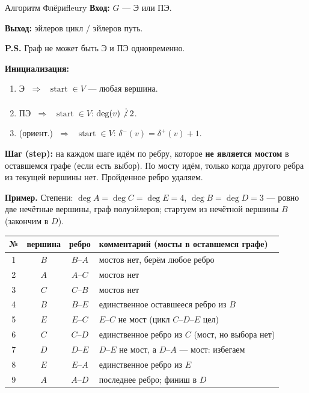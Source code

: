 \begin{algo}{Алгоритм Флёри}{fleury}
\textbf{Вход:} $G$ --- Э или ПЭ.

\textbf{Выход:} эйлеров цикл / эйлеров путь.

\medskip
\textbf{P.S.} Граф не может быть Э и ПЭ одновременно.

\medskip
\textbf{Инициализация:}
\begin{enumerate}
  \item Э $\;\Rightarrow\;$ $\operatorname{start} \in V$ --- любая вершина.
  \item ПЭ $\;\Rightarrow\;$ $\operatorname{start} \in V$: $\operatorname{deg}(v) \mathrel{\not\vdots} 2$.
  \item (ориент.) $\;\Rightarrow\;$ $\operatorname{start} \in V$: $\delta^-(v) = \delta^+(v) + 1$.
\end{enumerate}

\medskip
\textbf{Шаг (step):}
на каждом шаге идём по ребру, которое \textbf{не является мостом}
в оставшемся графе (если есть выбор). По мосту идём, только когда
другого ребра из текущей вершины нет. Пройденное ребро удаляем.

\medskip
\noindent\textbf{Пример.}
Степени: $\deg A = \deg C = \deg E = 4$, $\deg B = \deg D = 3$ ---
ровно две нечётные вершины, граф полуэйлеров; стартуем из нечётной
вершины $B$ (закончим в $D$).

\medskip
\begin{center}
\begin{tabular}{c|c|c|l}
№ & вершина & ребро & комментарий (мосты в оставшемся графе) \\ \hline
1 & $B$ & $B$--$A$ & мостов нет, берём любое ребро \\
2 & $A$ & $A$--$C$ & мостов нет \\
3 & $C$ & $C$--$B$ & мостов нет \\
4 & $B$ & $B$--$E$ & единственное оставшееся ребро из $B$ \\
5 & $E$ & $E$--$C$ & $E$--$C$ не мост (цикл $C$--$D$--$E$ цел) \\
6 & $C$ & $C$--$D$ & единственное ребро из $C$ (мост, но выбора нет) \\
7 & $D$ & $D$--$E$ & $D$--$E$ не мост, а $D$--$A$ --- мост: избегаем \\
8 & $E$ & $E$--$A$ & единственное ребро из $E$ \\
9 & $A$ & $A$--$D$ & последнее ребро; финиш в $D$ \\
\end{tabular}
\end{center}


\end{algo}
